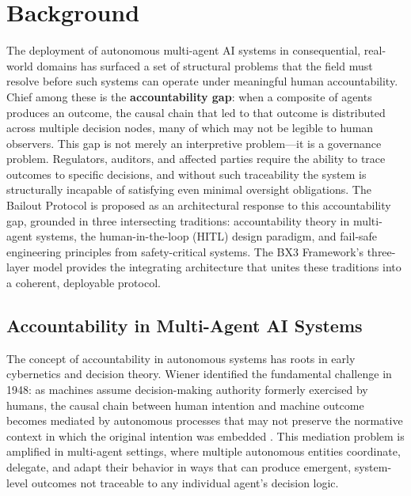 \section{Background}

The deployment of autonomous multi-agent AI systems in consequential, real-world domains has surfaced a set of structural problems that the field must resolve before such systems can operate under meaningful human accountability. Chief among these is the \textbf{accountability gap}: when a composite of agents produces an outcome, the causal chain that led to that outcome is distributed across multiple decision nodes, many of which may not be legible to human observers. This gap is not merely an interpretive problem—it is a governance problem. Regulators, auditors, and affected parties require the ability to trace outcomes to specific decisions, and without such traceability the system is structurally incapable of satisfying even minimal oversight obligations. The Bailout Protocol is proposed as an architectural response to this accountability gap, grounded in three intersecting traditions: accountability theory in multi-agent systems, the human-in-the-loop (HITL) design paradigm, and fail-safe engineering principles from safety-critical systems. The BX3 Framework's three-layer model provides the integrating architecture that unites these traditions into a coherent, deployable protocol.

\subsection{Accountability in Multi-Agent AI Systems}

The concept of accountability in autonomous systems has roots in early cybernetics and decision theory. Wiener identified the fundamental challenge in 1948: as machines assume decision-making authority formerly exercised by humans, the causal chain between human intention and machine outcome becomes mediated by autonomous processes that may not preserve the normative context in which the original intention was embedded \cite{wiener1948}. This mediation problem is amplified in multi-agent settings, where multiple autonomous entities coordinate, delegate, and adapt their behavior in ways that can produce emergent, system-level outcomes not traceable to any individual agent's decision logic.

